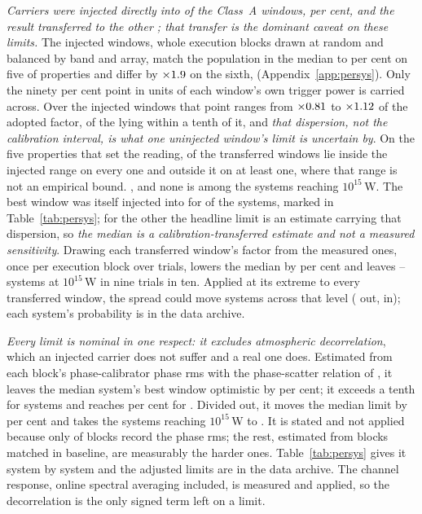 \emph{Carriers were injected directly into \SensNInj{} of the \NWinA{}
Class~A windows, \SensNInjPct{} per cent, and the result transferred to the
other \SensNTransfer; that transfer is the dominant caveat on these limits.}
The injected windows, whole execution blocks drawn at random and balanced by
band and array, match the population in the median to \RpCovOtherPct{} per
cent on five of \RpNAxis{} properties and differ by $\times1.9$
on the sixth, \RpCovWorstAxis{} (Appendix~\ref{app:persys}). Only the ninety
per cent point in units of each window's own trigger power is carried across.
Over the injected windows that point ranges from $\times0.81$ to
$\times1.12$ of the adopted factor, \NmDispNTenth{} of the
\SensNInj{} lying within a tenth of it, and \emph{that dispersion, not the
calibration interval, is what one uninjected window's limit is uncertain by}.
On the five properties that set the reading, \NgNInterpWin{} of the
\SensNTransfer{} transferred windows lie inside the injected range on every
one and \NgNExtrapWin{} outside it on at least one, where that range is not an
empirical bound. \NgExtrapTakeClause{}, and none is among the \NSysEfifteen{}
systems reaching $10^{15}$\,W. The best window was itself injected into for
\SmcNMeasSys{} of the \NSysALim{} systems, marked in Table~\ref{tab:persys};
for the other \SmcNEstSys{} the headline limit is an estimate carrying that
dispersion, so \emph{the median is a calibration-transferred estimate and not
a measured sensitivity}. Drawing each transferred window's factor from the
\SensNInj{} measured ones, once per execution block over \SvNTrial{} trials,
lowers the median by \SvRsMedShiftPct{} per cent and leaves
\SvRsBlkNLo--\SvRsBlkNHi{} systems at $10^{15}$\,W in nine trials in ten.
Applied at its extreme to every transferred window, the spread could move
\SvSprN{} systems across that level (\SvSprNOut{} out, \SvSprNIn{} in); each
system's probability is in the data archive.

\emph{Every limit is nominal in one respect: it excludes atmospheric
decorrelation}, which an injected carrier does not suffer and a real one does.
Estimated from each block's phase-calibrator phase rms
\citep[\S\S10.4.11, 11.3.1]{ALMAHandbook} with the phase-scatter relation of
\citet[Eq.~3]{Richards2022}, it leaves the median system's best window optimistic by \NmDecSysMedPct{} per
cent; it exceeds a tenth for \NmDecNBigSys{} systems and reaches
\NmDecSysWorstPct{} per cent for \NmDecSysWorstName. Divided out, it moves the median limit by
\NmDecAdjShiftPct{} per cent and takes the \NSysEfifteen{} systems reaching
$10^{15}$\,W to \NmDecAdjNEfifteen. It is stated and not applied because only \SensDecorNBlk{} of
\SensDecorNBlkTot{} blocks record the phase rms; the rest, estimated from
blocks matched in baseline, are measurably the harder ones.
Table~\ref{tab:persys} gives it system by system and the adjusted limits are
in the data archive. The channel response, online
spectral averaging included, is measured and applied, so the decorrelation is
the only signed term left on a limit.

